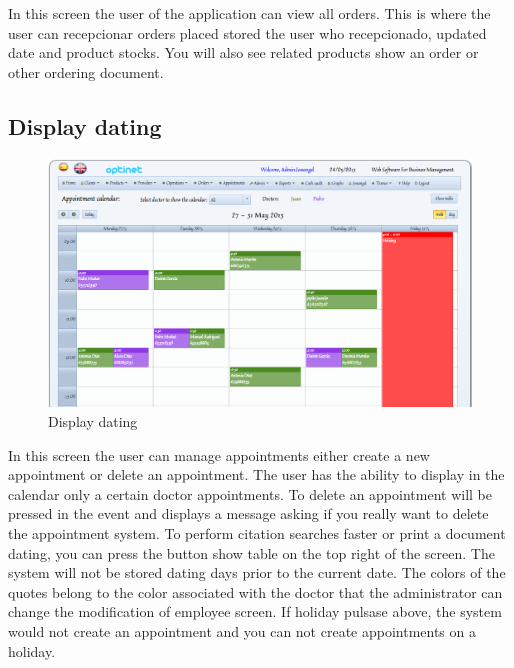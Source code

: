 \documentclass[a4paper,11pt]{book}
\begin{document}
In this screen the user of the application can view all orders. This is where the user can recepcionar orders placed stored the user who recepcionado, updated date and product stocks. You will also see related products show an order or other ordering document.

\subsection {Display dating}

\begin{figure}[!htb]
  \centering
    \includegraphics[scale=0.35]{icapcitas.png}
  \caption{Display dating}
  \label{a}
\end{figure}

In this screen the user can manage appointments either create a new appointment or delete an appointment. The user has the ability to display in the calendar only a certain doctor appointments. To delete an appointment will be pressed in the event and displays a message asking if you really want to delete the appointment system. To perform citation searches faster or print a document dating, you can press the button show table on the top right of the screen. The system will not be stored dating days prior to the current date. The colors of the quotes belong to the color associated with the doctor that the administrator can change the modification of employee screen. If holiday pulsase above, the system would not create an appointment and you can not create appointments on a holiday.
\end{document}
